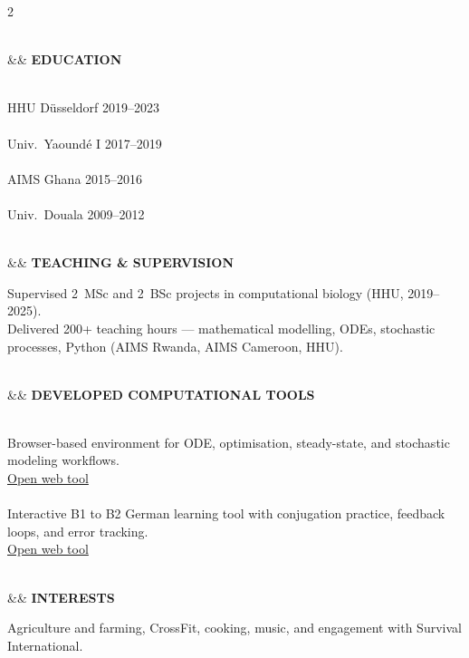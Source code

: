 \documentclass[10pt,a4paper]{article}
\newlength{\secbefore}   \setlength{\secbefore}{5.2pt}
\newlength{\secafter}    \setlength{\secafter}{2.3pt}
\newlength{\sidesecbefore}\setlength{\sidesecbefore}{4.2pt}
\newcommand{\sidecvsection}[2][]{%
    \vspace{\sidesecbefore}%
    \noindent{\color{teal}\rule{\linewidth}{1.0pt}}\\[-2pt]%
    \noindent%
    \ifx&#1&\else{\footnotesize\color{teal}#1\enspace}\fi%
    {\footnotesize\bfseries\color{ink}\MakeUppercase{#2}}%
    \par\vspace{\secafter}%
}
\begin{document}
\begin{paracol}{2}
\begin{leftcolumn}
\sidecvsection[\faGraduationCap]{Education}

{\footnotesize\justifying
{}\\
{\color{muted}HHU D\"usseldorf \hfill 2019--2023}\\[2pt]
\\
{\color{muted}Univ.\ Yaound\'e I \hfill 2017--2019}\\[2pt]
\\
{\color{muted}AIMS Ghana \hfill 2015--2016}\\[2pt]
\\
{\color{muted}Univ.\ Douala \hfill 2009--2012}}

\sidecvsection[\faPencil]{Teaching \& Supervision}

{\footnotesize\justifying\color{muted}
Supervised 2~MSc and 2~BSc projects in computational biology (HHU, 2019--2025).\\[2pt]
Delivered 200+ teaching hours --- mathematical modelling, ODEs, stochastic processes, Python (AIMS Rwanda, AIMS Cameroon, HHU).}

\sidecvsection[\faLaptop]{Developed Computational Tools}

{\footnotesize\justifying
{}\\
{\color{muted}Browser-based environment for ODE, optimisation, steady-state, and stochastic modeling workflows.}\\[1.5pt]
{\color{teal}\faExternalLink\enspace\href{https://chilperic.github.io/chilperic_ode_solver/}{Open web tool}}\\[4pt]
\\
{\color{muted}Interactive B1 to B2 German learning tool with conjugation practice, feedback loops, and error tracking.}\\[1.5pt]
{\color{teal}\faExternalLink\enspace\href{https://chilperic.github.io/Deutsch-wipa-2026/}{Open web tool}}}

\sidecvsection[\faHeart]{Interests}
{\footnotesize\color{muted}Agriculture and farming, CrossFit, cooking, music, and engagement with Survival International.}

\vfill
\end{leftcolumn}

\begin{rightcolumn}
\justifying


\end{rightcolumn}
\end{paracol}
\end{document}
